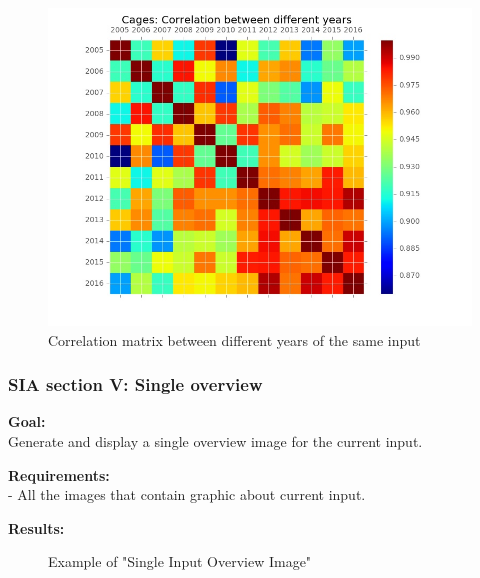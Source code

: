 \begin{figure}[H]
	\centering
    \includegraphics[width=1\textwidth]{Files/Cages_Years_Matrix.jpg}
    \caption{Correlation matrix between different years of the same input}
\end{figure}


\newpage
\subsubsection{SIA section V: Single overview}

\textbf{Goal:}\\
Generate and display a single overview image for the current input.

\textbf{Requirements:}\\
- All the images that contain graphic about current input.

\textbf{Results:}
\begin{figure}[H]
    \caption{Example of "Single Input Overview Image"}
\end{figure}

